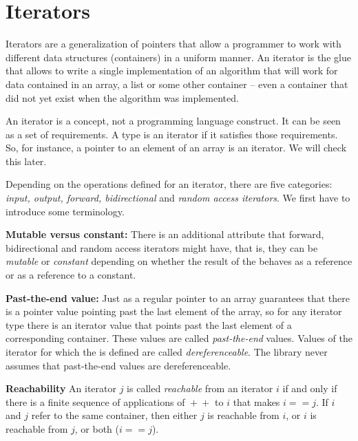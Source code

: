 

\cleardoublepage
\chapter{Iterators}
\label{chapterIterators}

Iterators are a generalization of pointers that allow a programmer to
work with different data structures (containers) in a uniform manner.
An iterator is the glue that allows to write a single implementation of
an algorithm that will work for data contained in an array, a list or
some other container -- even a container that did not yet exist when the
algorithm was implemented.

An iterator is a concept, not a programming language construct. It can
be seen as a set of requirements. A type is an iterator if it satisfies
those requirements. So, for instance, a pointer to an element of an
array is an iterator. We will check this later.

Depending on the operations defined for an iterator, there are five
categories: {\em input, output, forward, bidirectional} and {\em
random access iterators}. We first have to introduce some terminology.

{\bf Mutable versus constant:}
There is an additional attribute that forward, bidirectional and
random access iterators might have, that is, they can be {\em mutable}
or {\em constant} depending on whether the result of the 
 behaves as a reference or as a reference to a constant.

{\bf Past-the-end value:}
Just as a regular pointer to an array guarantees that there is a
pointer value pointing past the last element of the array, so for any
iterator type there is an iterator value that points past the last
element of a corresponding container. These values are called {\em
past-the-end} values. Values of the iterator for which the 
is defined are called {\em dereferenceable}.
The library never assumes that past-the-end values are
dereferenceable.

{\bf Reachability} An iterator $j$ is called {\em reachable} from an
iterator $i$ if and only if there is a finite sequence of applications
of $\!+\!+$ to $i$ that makes $i == j$. If $i$ and
$j$ refer to the same container, then either $j$ is reachable from
$i$, or $i$ is reachable from $j$, or both ($i == j$).

